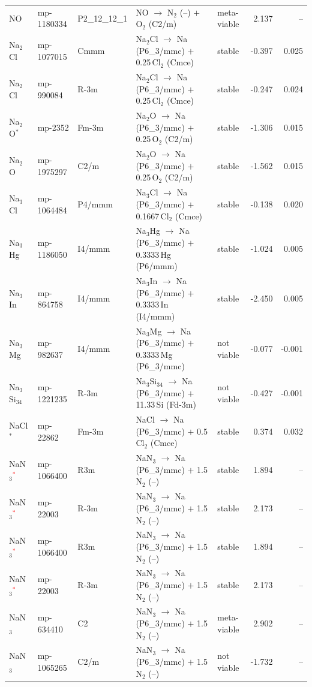 \begin{longtable}{@{}ll l@{\hspace{4pt}} p{4.6cm} l@{\hspace{4pt}} rr@{}}
NO & mp-1180334 & P2\_12\_12\_1 & NO $\to$ N$_{2}$ (--) $+$ O$_{2}$ (C2/m) & meta-viable & 2.137 & -- \\
Na$_{2}$Cl & mp-1077015 & Cmmm & Na$_{2}$Cl $\to$ Na (P6\_3/mmc) $+$ 0.25\,Cl$_{2}$ (Cmce) & stable & -0.397 & 0.025 \\
Na$_{2}$Cl & mp-990084 & R-3m & Na$_{2}$Cl $\to$ Na (P6\_3/mmc) $+$ 0.25\,Cl$_{2}$ (Cmce) & stable & -0.247 & 0.024 \\
Na$_{2}$O$^*$ & mp-2352 & Fm-3m & Na$_{2}$O $\to$ Na (P6\_3/mmc) $+$ 0.25\,O$_{2}$ (C2/m) & stable & -1.306 & 0.015 \\
Na$_{2}$O & mp-1975297 & C2/m & Na$_{2}$O $\to$ Na (P6\_3/mmc) $+$ 0.25\,O$_{2}$ (C2/m) & stable & -1.562 & 0.015 \\
Na$_{3}$Cl & mp-1064484 & P4/mmm & Na$_{3}$Cl $\to$ Na (P6\_3/mmc) $+$ 0.1667\,Cl$_{2}$ (Cmce) & stable & -0.138 & 0.020 \\
Na$_{3}$Hg & mp-1186050 & I4/mmm & Na$_{3}$Hg $\to$ Na (P6\_3/mmc) $+$ 0.3333\,Hg (P6/mmm) & stable & -1.024 & 0.005 \\
Na$_{3}$In & mp-864758 & I4/mmm & Na$_{3}$In $\to$ Na (P6\_3/mmc) $+$ 0.3333\,In (I4/mmm) & stable & -2.450 & 0.005 \\
Na$_{3}$Mg & mp-982637 & I4/mmm & Na$_{3}$Mg $\to$ Na (P6\_3/mmc) $+$ 0.3333\,Mg (P6\_3/mmc) & not viable & -0.077 & -0.001 \\
Na$_{3}$Si$_{34}$ & mp-1221235 & R-3m & Na$_{3}$Si$_{34}$ $\to$ Na (P6\_3/mmc) $+$ 11.33\,Si (Fd-3m) & not viable & -0.427 & -0.001 \\
NaCl$^*$ & mp-22862 & Fm-3m & NaCl $\to$ Na (P6\_3/mmc) $+$ 0.5\,Cl$_{2}$ (Cmce) & stable & 0.374 & 0.032 \\
NaN$_{3}$\textcolor{red}{$^*$} & mp-1066400 & R3m & NaN$_{3}$ $\to$ Na (P6\_3/mmc) $+$ 1.5\,N$_{2}$ (--) & stable & 1.894 & -- \\
NaN$_{3}$\textcolor{red}{$^*$} & mp-22003 & R-3m & NaN$_{3}$ $\to$ Na (P6\_3/mmc) $+$ 1.5\,N$_{2}$ (--) & stable & 2.173 & -- \\
NaN$_{3}$\textcolor{red}{$^*$} & mp-1066400 & R3m & NaN$_{3}$ $\to$ Na (P6\_3/mmc) $+$ 1.5\,N$_{2}$ (--) & stable & 1.894 & -- \\
NaN$_{3}$\textcolor{red}{$^*$} & mp-22003 & R-3m & NaN$_{3}$ $\to$ Na (P6\_3/mmc) $+$ 1.5\,N$_{2}$ (--) & stable & 2.173 & -- \\
NaN$_{3}$ & mp-634410 & C2 & NaN$_{3}$ $\to$ Na (P6\_3/mmc) $+$ 1.5\,N$_{2}$ (--) & meta-viable & 2.902 & -- \\
NaN$_{3}$ & mp-1065265 & C2/m & NaN$_{3}$ $\to$ Na (P6\_3/mmc) $+$ 1.5\,N$_{2}$ (--) & not viable & -1.732 & -- \\

\end{longtable}
